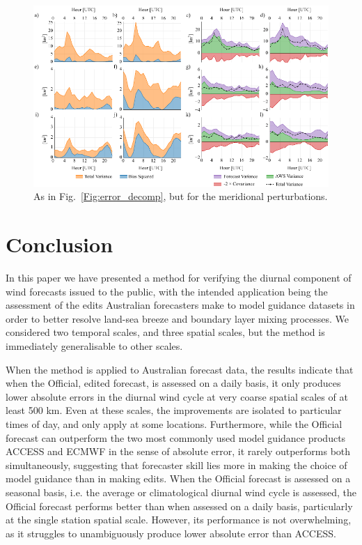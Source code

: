 \documentclass[twocol]{ametsoc}
\begin{document}
\begin{figure}
\centering
\includegraphics[width=39pc]{error_decomp_v.pdf}
\caption{As in Fig.~\ref{Fig:error_decomp}, but for the meridional perturbations.}
\label{Fig:error_decomp_v}
\end{figure}

\section{Conclusion}
\label{Sec:Conclusion}
In this paper we have presented a method for verifying the diurnal component of wind forecasts issued to the public, with the intended application being the assessment of the edits Australian forecasters make to model guidance datasets in order to better resolve land-sea breeze and boundary layer mixing processes. We considered two temporal scales, and three spatial scales, but the method is immediately generalisable to other scales. 

When the method is applied to Australian forecast data, the results indicate that when the Official, edited forecast, is assessed on a daily basis, it only produces lower absolute errors in the diurnal wind cycle at very coarse spatial scales of at least 500 km. Even at these scales, the improvements are isolated to particular times of day, and only apply at some locations. Furthermore, while the Official forecast can outperform the two most commonly used model guidance products ACCESS and ECMWF in the sense of absolute error, it rarely outperforms both simultaneously, suggesting that forecaster skill lies more in making the choice of model guidance than in making edits. When the Official forecast is assessed on a seasonal basis, i.e. the average or climatological diurnal wind cycle is assessed, the Official forecast performs better than when assessed on a daily basis, particularly at the single station spatial scale. However, its performance is not overwhelming, as it struggles to unambiguously produce lower absolute error than ACCESS. 
\end{document}
